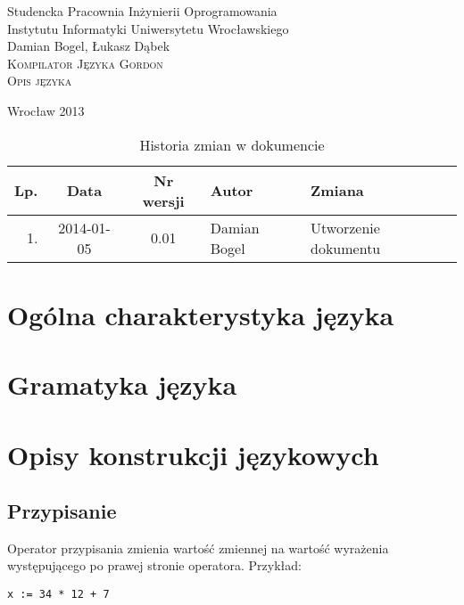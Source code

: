 \documentclass{documentation}
\begin{document}
\begin{titlepage}
\begin{center}
Studencka Pracownia Inżynierii Oprogramowania\\
Instytutu Informatyki Uniwersytetu Wrocławskiego\\[6cm]

Damian Bogel, Łukasz Dąbek\\[1cm]
\textsc{\LARGE Kompilator Języka Gordon}\\[0.5cm]
\textsc{\large Opis języka}

\vfill
Wrocław 2013 \\[2.5cm]

\end{center}
\end{titlepage}

\newpage
\begin{table}
	\centering
    \captionsetup{name=Tabela}
	\caption{Historia zmian w dokumencie}
		\begin{tabular}{|r|c|c|l|l|}
		\hline
		Lp.  & Data       & Nr wersji & Autor                 & Zmiana \\ \hline
		1.   & 2014-01-05 & 0.01 & Damian Bogel & Utworzenie dokumentu \\ \hline
	\end{tabular}
\end{table}
\newpage

\tableofcontents
\setcounter{page}{2}

\newpage

\section{Ogólna charakterystyka języka}

\section{Gramatyka języka}

\section{Opisy konstrukcji językowych}

\subsection{Przypisanie}
Operator przypisania zmienia wartość zmiennej na wartość wyrażenia występującego
po prawej stronie operatora. Przykład:
\begin{verbatim}
x := 34 * 12 + 7
\end{verbatim}
\end{document}
